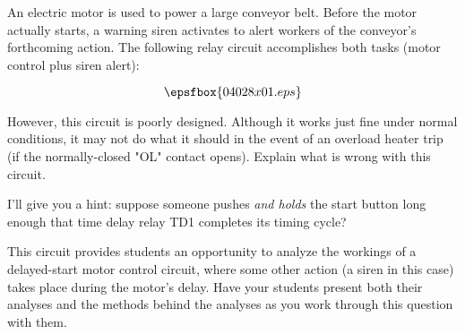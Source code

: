 

An electric motor is used to power a large conveyor belt.  Before the motor actually starts, a warning siren activates to alert workers of the conveyor's forthcoming action.  The following relay circuit accomplishes both tasks (motor control plus siren alert):

$$\epsfbox{04028x01.eps}$$

However, this circuit is poorly designed.  Although it works just fine under normal conditions, it may not do what it should in the event of an overload heater trip (if the normally-closed "OL" contact opens).  Explain what is wrong with this circuit.







I'll give you a hint: suppose someone pushes {\it and holds} the start button long enough that time delay relay TD1 completes its timing cycle?







This circuit provides students an opportunity to analyze the workings of a delayed-start motor control circuit, where some other action (a siren in this case) takes place during the motor's delay.  Have your students present both their analyses and the methods behind the analyses as you work through this question with them.




